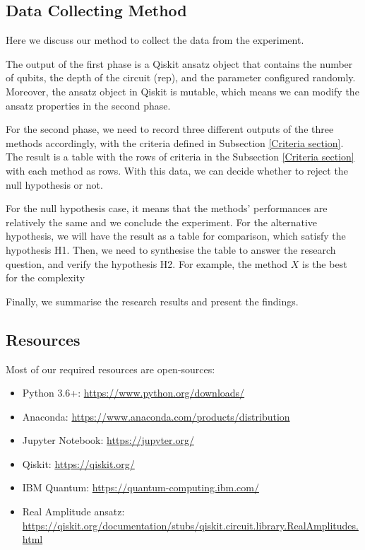 \subsection{Data Collecting Method}
\label{Data Collecting Section}
Here we discuss our method to collect the data from the experiment.

The output of the first phase is a Qiskit ansatz object that contains the number of qubits, the depth of the circuit (rep), and the parameter configured randomly.
Moreover, the ansatz object in Qiskit is mutable, which means we can modify the ansatz properties in the second phase.

For the second phase, we need to record three different outputs of the three methods accordingly, with the criteria defined in Subsection \ref{Criteria section}.
The result is a table with the rows of criteria in the Subsection \ref{Criteria section} with each method as rows.
With this data, we can decide whether to reject the null hypothesis or not.

For the null hypothesis case, it means that the methods' performances are relatively the same and we conclude the experiment.
For the alternative hypothesis, we will have the result as a table for comparison, which satisfy the hypothesis H1. 
Then, we need to synthesise the table to answer the research question, and verify the hypothesis H2. 
For example, the method $X$ is the best for the complexity

Finally, we summarise the research results and present the findings.

\subsection{Resources}
Most of our required resources are open-sources:
\begin{itemize}
    \item Python 3.6+: \url{https://www.python.org/downloads/}
    \item Anaconda: \url{https://www.anaconda.com/products/distribution}
    \item Jupyter Notebook: \url{https://jupyter.org/}
    \item Qiskit: \url{https://qiskit.org/}
    \item IBM Quantum: \url{https://quantum-computing.ibm.com/}
    \item Real Amplitude ansatz: \url{https://qiskit.org/documentation/stubs/qiskit.circuit.library.RealAmplitudes.html}
\end{itemize}

